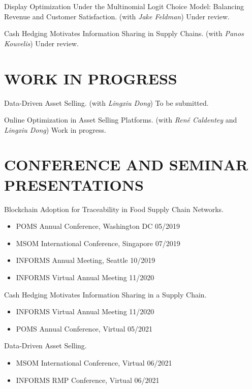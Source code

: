 \documentclass[margin, 10pt]{res} %
\begin{document}
\begin{resume}
Display Optimization Under the Multinomial Logit Choice Model: Balancing Revenue and Customer Satisfaction. (with {\it Jake Feldman})
Under review.

Cash Hedging Motivates Information Sharing in Supply Chains. (with {\it Panos Kouvelis})
Under review.

\section{WORK IN PROGRESS}
Data-Driven Asset Selling. (with {\it Lingxiu Dong})
To be submitted. 

Online Optimization in Asset Selling Platforms. (with {\it Ren\'{e} Caldentey} and {\it Lingxiu Dong})
Work in progress.


\section{CONFERENCE AND SEMINAR PRESENTATIONS}
Blockchain Adoption for Traceability in Food Supply Chain Networks.

\begin{itemize}
    \item POMS Annual Conference, Washington DC \hfill 05/2019
    \item MSOM International Conference, Singapore \hfill 07/2019
    \item INFORMS Annual Meeting, Seattle \hfill 10/2019
    \item INFORMS Virtual Annual Meeting \hfill 11/2020
\end{itemize}

Cash Hedging Motivates Information Sharing in a Supply Chain.

\begin{itemize}
    \item INFORMS Virtual Annual Meeting \hfill 11/2020
    \item POMS Annual Conference, Virtual \hfill 05/2021
\end{itemize}

Data-Driven Asset Selling.

\begin{itemize}
    \item MSOM International Conference, Virtual \hfill 06/2021
    \item INFORMS RMP Conference, Virtual \hfill 06/2021
\end{itemize}


\end{resume}
\end{document}
